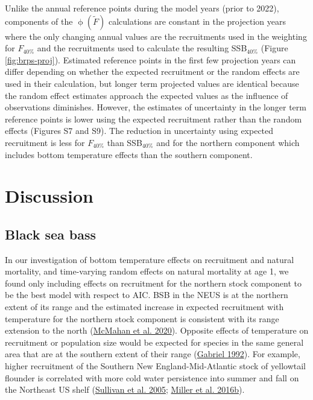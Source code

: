 \documentclass[
]{article}
\begin{document}
Unlike the annual reference points during the model years (prior to 2022), components of the \(\upphi(\widetilde{F})\) calculations are constant in the projection years where the only changing annual values are the recruitments used in the weighting for \(F_{40\%}\) and the recruitments used to calculate the resulting SSB\(_{40\%}\) (Figure \ref{fig:brps-proj}). Estimated reference points in the first few projection years can differ depending on whether the expected recruitment or the random effects are used in their calculation, but longer term projected values are identical because the random effect estimates approach the expected values as the influence of observations diminishes. However, the estimates of uncertainty in the longer term reference points is lower using the expected recruitment rather than the random effects (Figures S7 and S9). The reduction in uncertainty using expected recruitment is less for \(F_{40\%}\) than SSB\(_{40\%}\) and for the northern component which includes bottom temperature effects than the southern component.

\hypertarget{discussion}{%
\section*{Discussion}\label{discussion}}

\hypertarget{black-sea-bass}{%
\subsection*{Black sea bass}\label{black-sea-bass}}

In our investigation of bottom temperature effects on recruitment and natural mortality, and time-varying random effects on natural mortality at age 1, we found only including effects on recruitment for the northern stock component to be the best model with respect to AIC. BSB in the NEUS is at the northern extent of its range and the estimated increase in expected recruitment with temperature for the northern stock component is consistent with its range extension to the north (\protect\hyperlink{ref-mcmahanetal20}{McMahan et al. 2020}). Opposite effects of temperature on recruitment or population size would be expected for species in the same general area that are at the southern extent of their range (\protect\hyperlink{ref-gabriel92}{Gabriel 1992}). For example, higher recruitment of the Southern New England-Mid-Atlantic stock of yellowtail flounder is correlated with more cold water persistence into summer and fall on the Northeast US shelf (\protect\hyperlink{ref-sullivanetal05}{Sullivan et al. 2005}; \protect\hyperlink{ref-milleretal16}{Miller et al. 2016b}).
\end{document}
